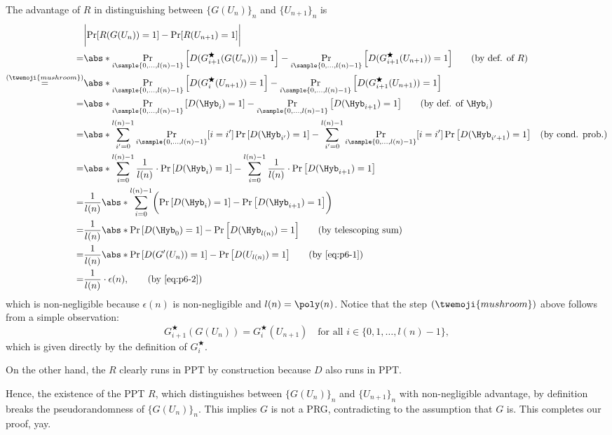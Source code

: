 \begin{answer}
    The advantage of $R$ in distinguishing between $\{G(U_n)\}_n$ and $\{U_{n+1}\}_n$ is
    \begin{align*}
        &\biggl\vert \Pr[R(G(U_n)) = 1]  -\Pr[R(U_{n+1}) = 1] \biggr\vert \\
        =&  \abs*{\Pr_{i\sample\{0,\ldots,l(n)-1\}}\left[D(G^\bigstar_{i +1}(G(U_n))) = 1\right]  -\Pr_{i\sample\{0,\ldots,l(n)-1\}}\left[D(G^\bigstar_{i +1}(U_{n+1})) = 1\right]} 
        \qquad \textrm{(by def. of $R$)}\\
        \stackrel{(\twemoji{mushroom})}{=}&  \abs*{\Pr_{i\sample\{0,\ldots,l(n)-1\}}\left[D(G^\bigstar_{i}(U_{n+1})) = 1\right]  -\Pr_{i\sample\{0,\ldots,l(n)-1\}}\left[D(G^\bigstar_{i +1}(U_{n+1})) = 1\right]} \\
        =&  \abs*{\Pr_{i\sample\{0,\ldots,l(n)-1\}}\left[D(\Hyb_i) = 1\right]  -\Pr_{i\sample\{0,\ldots,l(n)-1\}}\left[D(\Hyb_{i+1})= 1\right]}
        \qquad \textrm{(by def. of $\Hyb_i$)}\\
        =&  \abs*{\sum_{i'=0}^{l(n)-1} \Pr_{i\sample\{0,\ldots,l(n)-1\}}[i=i'] \Pr\left[D(\Hyb_{i'}) = 1\right]  - \sum_{i'=0}^{l(n)-1} \Pr_{i\sample\{0,\ldots,l(n)-1\}}[i=i'] \Pr\left[D(\Hyb_{i'+1})= 1\right]} 
        \quad \textrm{(by cond. prob.)}\\
        =&  \abs*{\sum_{i=0}^{l(n)-1} \frac{1}{l(n)}\cdot \Pr\left[D(\Hyb_i) = 1\right]  - \sum_{i=0}^{l(n)-1} \frac{1}{l(n)}\cdot \Pr\left[D(\Hyb_{i+1})= 1\right]} \\
        =&  \frac{1}{l(n)}\abs*{\sum_{i=0}^{l(n)-1} \biggl( \Pr\left[D(\Hyb_i) = 1\right]  -  \Pr\left[D(\Hyb_{i+1})= 1\right]\biggr)} \\
        =&  \frac{1}{l(n)}\abs*{  \Pr\left[D(\Hyb_0) = 1\right]  -  \Pr\left[D(\Hyb_{l(n)})= 1\right]}
         \qquad \textrm{(by telescoping sum)}\\
        =&  \frac{1}{l(n)}\abs*{  \Pr\left[D(G'(U_n)) = 1\right]  -  \Pr\left[D(U_{l(n)})= 1\right]}
        \qquad \textrm{(by \eqref{eq:p6-1})} \\
        =& \frac{1}{l(n)} \cdot \epsilon(n),
        \qquad \textrm{(by \eqref{eq:p6-2})}
    \end{align*}
    which is non-negligible because $\epsilon(n)$ is non-negligible and $l(n)=\poly(n)$. Notice that the step $(\twemoji{mushroom})$ above follows from a simple observation:
    \[
        G^\bigstar_{i+1}(G(U_n)) =  G^\bigstar_{i}(U_{n+1})\quad \textrm{for all } i\in \{0,1,\ldots,l(n)-1\},
    \]
    which is given directly by the definition of $G^\bigstar_i$. 

    On the other hand, the $R$ clearly runs in PPT by construction because $D$ also runs in PPT. 

    Hence, the existence of the PPT $R$, which distinguishes between $\{G(U_n)\}_n$ and $\{U_{n+1}\}_n$ with non-negligible advantage, by definition breaks the pseudorandomness of $\{G(U_n)\}_n$. This implies $G$ is not a PRG, contradicting to the assumption that $G$ is. This completes our proof, yay.
\end{answer}